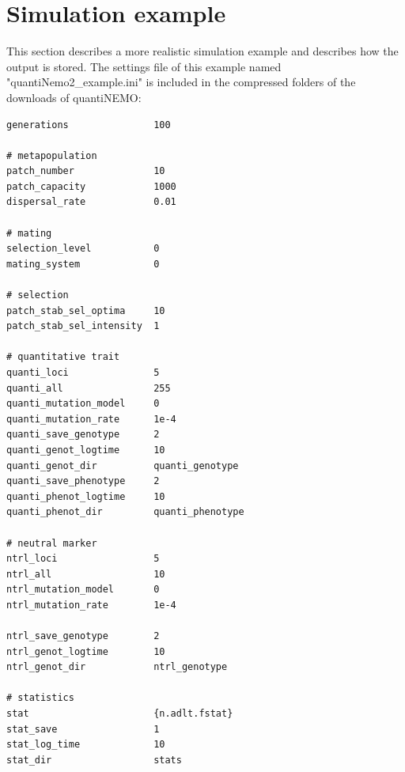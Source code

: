 \documentclass[letterpaper,12pt,oneside]{book}
\begin{document}
\section{Simulation example}
This section describes a more realistic simulation example and describes how the output is stored. The settings file of this example named "quantiNemo2\_example.ini" is included in the compressed folders of the downloads of quantiNEMO:
\begin{lstlisting}[frame=single]
generations               100
  
# metapopulation
patch_number              10
patch_capacity            1000
dispersal_rate            0.01
  
# mating
selection_level           0
mating_system             0
  
# selection
patch_stab_sel_optima     10
patch_stab_sel_intensity  1
  
# quantitative trait
quanti_loci               5 
quanti_all                255
quanti_mutation_model     0
quanti_mutation_rate      1e-4
quanti_save_genotype      2
quanti_genot_logtime      10
quanti_genot_dir          quanti_genotype
quanti_save_phenotype     2
quanti_phenot_logtime     10
quanti_phenot_dir         quanti_phenotype
  
# neutral marker
ntrl_loci                 5
ntrl_all                  10
ntrl_mutation_model       0
ntrl_mutation_rate        1e-4
 
ntrl_save_genotype        2
ntrl_genot_logtime        10
ntrl_genot_dir            ntrl_genotype
  
# statistics
stat                      {n.adlt.fstat}
stat_save                 1            
stat_log_time             10
stat_dir                  stats
\end{lstlisting}
\end{document}
